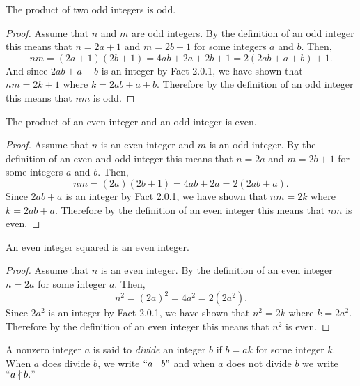 \documentclass{report}
\begin{document}
\begin{proposition*}{}
  The product of two odd integers is odd.
\end{proposition*}

\begin{proof}
  Assume that $n$ and $m$ are odd integers.
  By the definition of an odd integer this means that $n = 2a + 1$ and $m = 2b + 1$ for some integers $a$ and $b$.
  Then, $$nm = (2a + 1)(2b + 1) = 4ab + 2a + 2b + 1 = 2(2ab + a + b) + 1.$$
  And since $2ab + a + b$ is an integer by Fact 2.0.1, we have shown that $nm = 2k + 1$ where $k = 2ab + a + b$.
  Therefore by the definition of an odd integer this means that $nm$ is odd.
\end{proof}

\begin{proposition*}{}
  The product of an even integer and an odd integer is even.
\end{proposition*}

\begin{proof}
  Assume that $n$ is an even integer and $m$ is an odd integer.
  By the definition of an even and odd integer this means that $n = 2a$ and $m = 2b + 1$ for some integers $a$ and $b$.
  Then, $$nm = (2a)(2b + 1) = 4ab + 2a = 2(2ab + a).$$
  Since $2ab + a$ is an integer by Fact 2.0.1, we have shown that $nm = 2k$ where $k = 2ab + a$.
  Therefore by the definition of an even integer this means that $nm$ is even.
\end{proof}

\begin{proposition*}{}
  An even integer squared is an even integer.
\end{proposition*}

\begin{proof}
  Assume that $n$ is an even integer.
  By the definition of an even integer $n = 2a$ for some integer $a$.
  Then, $$n^2 = (2a)^2 = 4a^2 = 2(2a^2).$$
  Since $2a^2$ is an integer by Fact 2.0.1, we have shown that $n^2 = 2k$ where $k = 2a^2$.
  Therefore by the definition of an even integer this means that $n^2$ is even.
\end{proof}

\begin{definition}{}{}
  A nonzero integer $a$ is said to \emph{divide} an integer $b$ if $b = ak$ for some integer $k$.
  When $a$ does divide $b$, we write $``a \mid b"$ and when $a$ does not divide $b$ we write $``a \nmid b."$
\end{definition}
\end{document}
